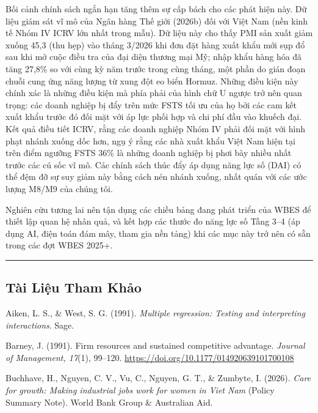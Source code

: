 \documentclass[12pt,a4paper]{article}
\begin{document}
Bối cảnh chính sách ngắn hạn tăng thêm sự cấp bách cho các phát hiện
này. Dữ liệu giám sát vĩ mô của Ngân hàng Thế giới (2026b) đối với Việt
Nam (nền kinh tế Nhóm IV ICRV lớn nhất trong mẫu). Dữ liệu này cho thấy
PMI sản xuất giảm xuống 45,3 (thu hẹp) vào tháng 3/2026 khi đơn đặt hàng
xuất khẩu mới sụp đổ sau khi mở cuộc điều tra của đại diện thương mại
Mỹ; nhập khẩu hàng hóa đã tăng 27,8\% so với cùng kỳ năm trước trong
cùng tháng, một phần do gián đoạn chuỗi cung ứng năng lượng từ xung đột
eo biển Hormuz. Những điều kiện này chính xác là những điều kiện mà phía
phải của hình chữ U ngược trở nên quan trọng: các doanh nghiệp bị đẩy
trên mức FSTS tối ưu của họ bởi các cam kết xuất khẩu trước đó đối mặt
với áp lực phối hợp và chi phí đầu vào khuếch đại. Kết quả điều tiết
ICRV, rằng các doanh nghiệp Nhóm IV phải đối mặt với hình phạt nhánh
xuống dốc hơn, ngụ ý rằng các nhà xuất khẩu Việt Nam hiện tại trên điểm
ngưỡng FSTS 36\% là những doanh nghiệp bị phơi bày nhiều nhất trước các
cú sốc vĩ mô. Các chính sách thúc đẩy áp dụng năng lực số (DAI) có thể
đệm đỡ sự suy giảm này bằng cách nén nhánh xuống, nhất quán với các ước
lượng M8/M9 của chúng tôi.

Nghiên cứu tương lai nên tận dụng các chiều bảng đang phát triển của
WBES để thiết lập quan hệ nhân quả, và kết hợp các thước đo năng lực số
Tầng 3--4 (áp dụng AI, điện toán đám mây, tham gia nền tảng) khi các mục
này trở nên có sẵn trong các đợt WBES 2025+.

\begin{center}\rule{0.5\linewidth}{0.5pt}\end{center}

\hypertarget{tuxe0i-liux1ec7u-tham-khux1ea3o}{%
\subsection{Tài Liệu Tham Khảo}\label{tuxe0i-liux1ec7u-tham-khux1ea3o}}

Aiken, L. S., \& West, S. G. (1991). \emph{Multiple regression: Testing
and interpreting interactions}. Sage.

Barney, J. (1991). Firm resources and sustained competitive advantage.
\emph{Journal of Management, 17}(1), 99--120.
\url{https://doi.org/10.1177/014920639101700108}

Buchhave, H., Nguyen, C. V., Vu, C., Nguyen, G. T., \& Zumbyte, I.
(2026). \emph{Care for growth: Making industrial jobs work for women in
Viet Nam} (Policy Summary Note). World Bank Group \& Australian Aid.
\end{document}
